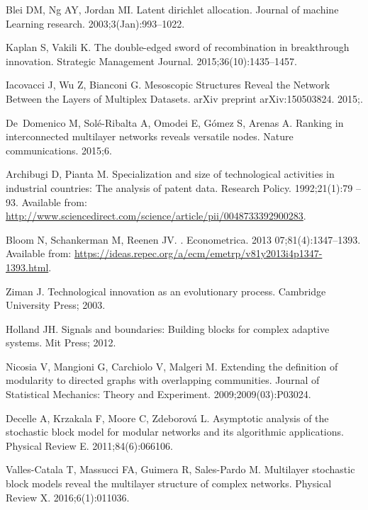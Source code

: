 \documentclass[10pt,A4,draft]{article}
\begin{document}
\begin{thebibliography}{10}
Blei DM, Ng AY, Jordan MI.
\newblock Latent dirichlet allocation.
\newblock Journal of machine Learning research. 2003;3(Jan):993--1022.

Kaplan S, Vakili K.
\newblock The double-edged sword of recombination in breakthrough innovation.
\newblock Strategic Management Journal. 2015;36(10):1435--1457.

Iacovacci J, Wu Z, Bianconi G.
\newblock Mesoscopic Structures Reveal the Network Between the Layers of
  Multiplex Datasets.
\newblock arXiv preprint arXiv:150503824. 2015;.

De~Domenico M, Sol{\'e}-Ribalta A, Omodei E, G{\'o}mez S, Arenas A.
\newblock Ranking in interconnected multilayer networks reveals versatile
  nodes.
\newblock Nature communications. 2015;6.

Archibugi D, Pianta M.
\newblock Specialization and size of technological activities in industrial
  countries: The analysis of patent data.
\newblock Research Policy. 1992;21(1):79 -- 93.
\newblock Available from:
  \url{http://www.sciencedirect.com/science/article/pii/0048733392900283}.

Bloom N, Schankerman M, Reenen JV.
.
\newblock Econometrica. 2013 07;81(4):1347--1393.
\newblock Available from:
  \url{https://ideas.repec.org/a/ecm/emetrp/v81y2013i4p1347-1393.html}.

Ziman J.
\newblock Technological innovation as an evolutionary process.
\newblock Cambridge University Press; 2003.

Holland JH.
\newblock Signals and boundaries: Building blocks for complex adaptive systems.
\newblock Mit Press; 2012.

Nicosia V, Mangioni G, Carchiolo V, Malgeri M.
\newblock Extending the definition of modularity to directed graphs with
  overlapping communities.
\newblock Journal of Statistical Mechanics: Theory and Experiment.
  2009;2009(03):P03024.

Decelle A, Krzakala F, Moore C, Zdeborov{\'a} L.
\newblock Asymptotic analysis of the stochastic block model for modular
  networks and its algorithmic applications.
\newblock Physical Review E. 2011;84(6):066106.

Valles-Catala T, Massucci FA, Guimera R, Sales-Pardo M.
\newblock Multilayer stochastic block models reveal the multilayer structure of
  complex networks.
\newblock Physical Review X. 2016;6(1):011036.


\end{thebibliography}
\end{document}
